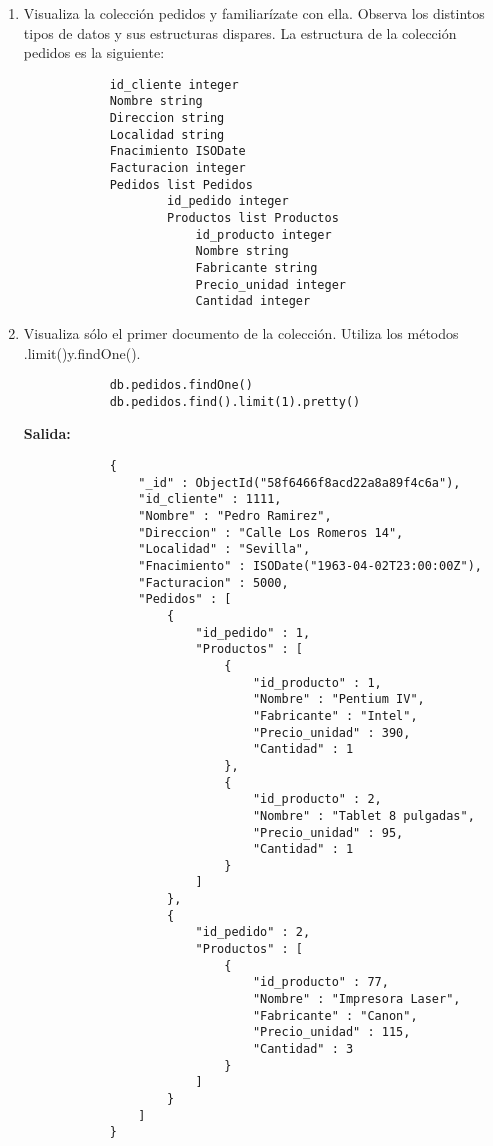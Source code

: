 \begin{enumerate}
	\item Visualiza la colección pedidos y familiarízate con ella. Observa los distintos tipos de datos y sus estructuras dispares.
		La estructura de la colección pedidos es la siguiente:
		\begin{lstlisting}
			id_cliente integer
			Nombre string
			Direccion string
			Localidad string
  			Fnacimiento ISODate
			Facturacion integer
			Pedidos list Pedidos
					id_pedido integer
					Productos list Productos
						id_producto integer
						Nombre string
						Fabricante string
						Precio_unidad integer
						Cantidad integer
		\end{lstlisting}
	\item Visualiza sólo el primer documento de la colección. Utiliza los métodos .limit()y.findOne().
		\begin{lstlisting}
			db.pedidos.findOne()
			db.pedidos.find().limit(1).pretty()
		\end{lstlisting}
		\textbf{Salida:}
		\begin{lstlisting}
			{
				"_id" : ObjectId("58f6466f8acd22a8a89f4c6a"),
				"id_cliente" : 1111,
				"Nombre" : "Pedro Ramirez",
				"Direccion" : "Calle Los Romeros 14",
				"Localidad" : "Sevilla",
				"Fnacimiento" : ISODate("1963-04-02T23:00:00Z"),
				"Facturacion" : 5000,
				"Pedidos" : [
					{
						"id_pedido" : 1,
						"Productos" : [
							{
								"id_producto" : 1,
								"Nombre" : "Pentium IV",
								"Fabricante" : "Intel",
								"Precio_unidad" : 390,
								"Cantidad" : 1
							},
							{
								"id_producto" : 2,
								"Nombre" : "Tablet 8 pulgadas",
								"Precio_unidad" : 95,
								"Cantidad" : 1
							}
						]
					},
					{
						"id_pedido" : 2,
						"Productos" : [
							{
								"id_producto" : 77,
								"Nombre" : "Impresora Laser",
								"Fabricante" : "Canon",
								"Precio_unidad" : 115,
								"Cantidad" : 3
							}
						]
					}
				]
			}
		\end{lstlisting}
		

\end{enumerate}
